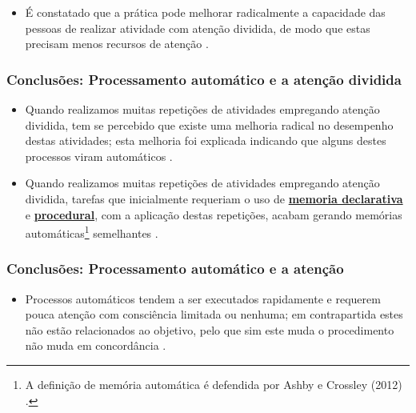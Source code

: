 \begin{itemize}
\item É constatado que a prática pode melhorar radicalmente a capacidade das pessoas de
realizar atividade com atenção dividida,
de modo que estas precisam menos recursos de atenção  
\cite[pp. 190]{eysenck2017manual} \cite[pp. 111]{pake2019psicologia}.
\end{itemize}

\subsubsection{Conclusões: Processamento automático e a atenção dividida}
\begin{itemize}
\item Quando realizamos muitas repetições de atividades empregando atenção dividida,
tem se percebido que existe uma melhoria radical no desempenho destas atividades;
esta melhoria foi explicada indicando que alguns destes processos viram automáticos  \cite[pp. 196]{eysenck2017manual}.


\item Quando realizamos muitas repetições de atividades empregando atenção dividida,
tarefas que inicialmente requeriam o uso de \hyperref[subsubsec:explicita]{\textbf{memoria declarativa}} 
e \hyperref[reflab:memprocedural]{\textbf{procedural}},
com a aplicação destas repetições, acabam gerando memórias automáticas\footnote{
A definição de memória automática é defendida por 
Ashby e Crossley (2012) \cite{doi:10.1002/wcs.1172} \cite[pp. 199]{eysenck2017manual}.} semelhantes \cite[pp. 199]{eysenck2017manual}.
\end{itemize}

\subsubsection{Conclusões: Processamento automático e a atenção}
\begin{itemize}
\item Processos automáticos tendem a ser executados rapidamente
e requerem pouca atenção com consciência limitada ou nenhuma; 
em contrapartida estes não estão relacionados ao objetivo,
pelo que sim este muda o procedimento não muda em concordância  \cite[pp. 199]{eysenck2017manual}.
\end{itemize}

